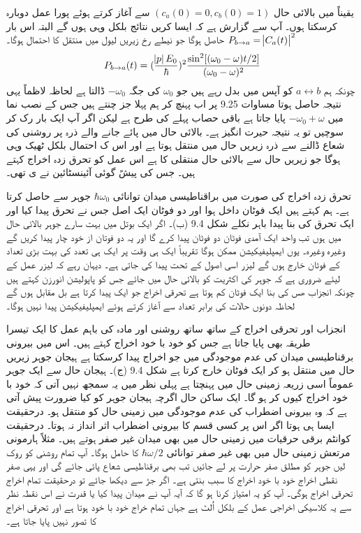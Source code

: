 یقیناً میں بالائی حال \((c_a(0)=0, c_b(0)=1)\) سے آغاز کرتے ہوئے پورا عمل دوبارہ کرسکتا ہوں۔ آپ سے گزارش ہے کہ ایسا کریں نتائج بلکل وہی ہوں گے البتہ اس بار \(P_{b\rightarrow a} = \abs{C_a(t)}^2\) حاصل ہوگا جو نیطے رخ زیریں لیول میں منتقل کا احتمال ہوگا۔
\begin{align}
	P_{b\rightarrow a} (t) = (\frac{\abs{p}E_0}{\hbar})^2 \frac{\sin^2[(\omega_0 - \omega)t/2]}{(\omega_0 - \omega)^2}
\end{align}
چونکہ ہم \(a\leftrightarrow b\) کو آپس میں بدل رہے ہیں جو \(\omega_0\) کی جگہ \(-\omega_0\) ڈالتا ہے لحاظہ لاظماً یہی نتیجہ حاصل ہوتا مساوات \num{9.25} پر اب پہنچ کر ہم پہلا جز چنتے ہیں جس کے نصب نما میں \(-\omega_0 + \omega\) پایا جاتا ہے باقی حصاب پہلے کی طرح ہے لیکن اگر آپ ایک بار رک کر سوچیں تو یہ نتیجہ حیرت انگیز ہے۔ بالائی حال میں پائے جانے والے ذرہ پر روشنی کی شعاع ڈالنے سے ذرہ زیریں حال میں منتقل ہوتا ہے اور اس ک احتمال بلکل ٹھیک وہی ہوگا جو زیریں حال سے بالائی حال منتقلی کا ہے اس عمل کو تحرق زدہ اخراج کہتے ہیں۔ جس کی پیشً گوئی آئینسٹائین نے ی تھی۔

تحرق زدہ اخراج کی صورت میں براقناطیسی میدان توانائی \(\hbar\omega_0\) جوہر سے حاصل کرتا ہے۔ ہم کہتے ہیں ایک فوٹان داخل ہوا اور دو فوٹان ایک اصل جس نے تحرق پیدا کیا اور ایک تحرق کی بنا پیدا باہر نکلے شکل \num{9.4} (ب)۔ اگر ایک بوتل میں بہت سارے جوہر بالائی حال میں ہوں تب واحد ایک آمدی فوٹان دو فوٹان پیدا کرے گا اور یہ دو فوتان از خود چار پیدا کریں گے وغیرہ وغیرہ۔ یوں ایمپلیفیکیشن ممکن ہوگا تقریباً ایک ہی وقت پر ایک ہی تعدد کی بہت بڑی تعداد کے فوٹان خارج ہوں گے لیزر اسی اصول کے تحت پیدا کی جاتی ہے۔ دیہان رہے کہ لیزر عمل کے لیئے ضروری ہے کہ جوہر کی اکثریت کو بالائی حال میں جائے جس کو پاپولیشن انورزن کہتے ہیں چونکہ انجزاب ھس کی بنا ایک فوٹان کم ہوتا ہے تحرقی اخراج جو ایک پیدا کرتا ہے بل مقابل ہوں گے لحاظہ دونوں حالات کی برابر تعداد سے آغاز کرتے ہوئے ایمپلیفیکیشن پیدا نہیں ہوگا۔

انجزاب اور تحرقی اخراج کے ساتھ ساتھ روشنی اور مادہ کی باہم عمل کا ایک تیسرا طریقہ بھی پایا جاتا ہے جس کو خود با خود اخراج کہتے ہیں۔ اس میں بیرونی برقناطیسی میدان کی عدم موجودگی میں جو اخراج پیدا کرسکتا ہے ہیجان جوہر زیریں حال میں منتقل ہو کر ایک فوٹان خارج کرتا ہے شکل \num{9.4} (ج)۔ 	ہیجان حال سے ایک جوہر عموماً اسی زریعہ زمینی حال میں پہنچتا ہے پہلی نظر میں یہ سمجھ نہیں آتی کہ خود با خود اخراج کیوں کر ہو گا۔ ایک ساکن حال اگرچہ ہیجان جوہر کو کیا ضرورت پیش آتی ہے کہ وہ بیرونی اضطراب کی عدم موجودگی میں زمینی حال کو منتقل ہو۔ درحقیقت ایسا ہی ہوتا اگر اس پر کسی قسم کا بیرونی اضطراب اثر انداز نہ ہوتا۔ درحقیقت کوانٹم برقی حرقیات میں زمینی حال میں بھی میدان غیر صفر ہوتے ہیں۔ مثلاً ہارمونی مرتعش زمینی حال میں بھی غیر صفر توانائی \(\hbar\omega/2\) کا حامل ہوگا۔ آپ تمام روشنی کو روک لیں جوہر کو مطلق صفر حرارت پر لے جائیں تب بھی برقناطیسی شعاع پائی جائے گی اور یہی صفر نقطی اخراج خود با خود اخراج کا سبب بنتی ہے۔ اگر جڑ سے دیکھا جائے تو درحقیقت تمام اخراج تحرقی اخراج ہوگی۔ آپ کو یہ امتیاز کرنا ہو گا کہ آیہ آپ نے میدان پیدا کیا یا قدرت نے اس نقطہ نظر سے یہ کلاسیکی اخراجی عمل کے بلکل اُلٹ ہے جہاں تمام خراج خود با خود ہوتا ہے اور تحرقی اخراج کا تصور نہیں پایا جاتا ہے۔

